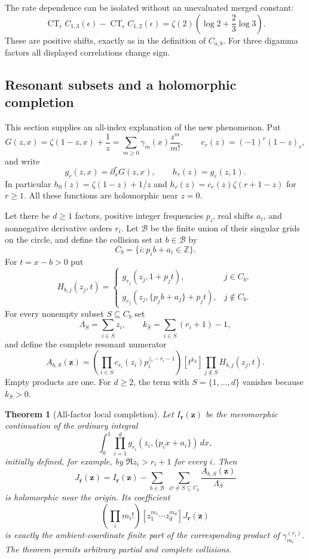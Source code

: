 \documentclass[11pt,a4paper]{article}
\numberwithin{equation}{section}
\newtheorem{theorem}{Theorem}[section]
\theoremstyle{definition}
\theoremstyle{remark}
\begin{document}
The rate dependence can be isolated without an unevaluated merged
constant:
\begin{equation}\label{cl:rate-difference}
 \operatorname{CT}_{\epsilon}C_{1,3}(\epsilon)
 -\operatorname{CT}_{\epsilon}C_{1,2}(\epsilon)
 =\zeta(2)\left(\log2+\frac23\log3\right).
\end{equation}
These are positive shifts, exactly as in the definition of $C_{a,b}$.
For three digamma factors all displayed correlations change sign.

\subsection{Resonant subsets and a holomorphic completion}
\label{cl:subsets}

This section supplies an all-index explanation of the new phenomenon.
Put
\[
 G(z,x)=\zeta(1-z,x)+\frac1z
     =\sum_{m\ge0}\gamma_m(x)\frac{z^m}{m!},\qquad
 c_r(z)=(-1)^r(1-z)_r,
\]
and write
\[
 g_r(z,x)=\partial_x^rG(z,x),\qquad h_r(z)=g_r(z,1).
\]
In particular $h_0(z)=\zeta(1-z)+1/z$ and
$h_r(z)=c_r(z)\zeta(r+1-z)$ for $r\ge1$. All these functions are
holomorphic near $z=0$.

Let there be $d\ge1$ factors, positive integer frequencies $p_i$, real
shifts $a_i$, and nonnegative derivative orders $r_i$. Let
$\mathcal B$ be the finite union of their singular grids on the circle,
and define the collision set at $b\in\mathcal B$ by
\[
 C_b=\{i:p_i b+a_i\in\mathbb Z\}.
\]
For $t=x-b>0$ put
\[
 H_{b,j}(z_j,t)=
 \begin{cases}
 g_{r_j}(z_j,1+p_jt),&j\in C_b,\\
 g_{r_j}(z_j,\{p_jb+a_j\}+p_jt),&j\notin C_b.
 \end{cases}
\]
For every nonempty subset $S\subseteq C_b$ set
\[
 \Lambda_S=\sum_{i\in S}z_i,\qquad
 k_S=\sum_{i\in S}(r_i+1)-1,
\]
and define the complete resonant numerator
\[
 A_{b,S}(\boldsymbol z)=
 \left(\prod_{i\in S}c_{r_i}(z_i)p_i^{z_i-r_i-1}\right)
 [t^{k_S}]\prod_{j\notin S}H_{b,j}(z_j,t).
\]
Empty products are one. For $d\ge2$, the term with
$S=\{1,\dots,d\}$ vanishes because $k_S>0$.

\begin{theorem}[All-factor local completion]
\label{cl:allfactor}
Let $I_{\boldsymbol r}(\boldsymbol z)$ be the meromorphic continuation
of the ordinary integral
\[
 \int_0^1\prod_{i=1}^d
      g_{r_i}(z_i,\{p_i x+a_i\})\,dx,
\]
initially defined, for example, by $\Re z_i>r_i+1$ for every $i$.
Then
\begin{equation}\label{cl:completion}
 J_{\boldsymbol r}(\boldsymbol z)
 =I_{\boldsymbol r}(\boldsymbol z)
       -\sum_{b\in\mathcal B}\ \sum_{\varnothing\ne S\subseteq C_b}
              \frac{A_{b,S}(\boldsymbol z)}{\Lambda_S}
\end{equation}
is holomorphic near the origin. Its coefficient
\[
 \left(\prod_i m_i!\right)[z_1^{m_1}\cdots z_d^{m_d}]
              J_{\boldsymbol r}(\boldsymbol z)
\]
is exactly the ambient-coordinate finite part of the corresponding
product of $\gamma_{m_i}^{(r_i)}$. The theorem permits arbitrary partial
and complete collisions.
\end{theorem}
\end{document}
